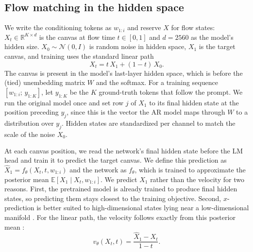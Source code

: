 \documentclass[11pt]{article}
\begin{document}
\subsection{Flow matching in the hidden space}
We write the conditioning tokens as $w_{1:i}$ and reserve $X$ for flow states: $X_t \in \mathbb{R}^{K\times d}$ is the canvas at flow time $t\in[0,1]$ and $d=2560$ as the model's hidden size. $X_0\sim\mathcal{N}(0,I)$ is random noise in hidden space, $X_1$ is the target canvas, and training uses the standard linear path
\begin{equation*}
X_t = t\,X_1 + (1-t)\,X_0 .
\end{equation*}
The canvas is present in the model's last-layer hidden space, which is before the (tied) unembedding matrix $W$ and the softmax. For a training sequence $[w_{1:i};\,y_{1:K}]$, let $y_{1:K}$ be the $K$ ground-truth tokens that follow the prompt. We run the original model once and set row $j$ of $X_1$ to its final hidden state at the position preceding $y_j$, since this is the vector the AR model maps through $W$ to a distribution over $y_j$. Hidden states are standardized per channel to match the scale of the noise $X_0$.

At each canvas position, we read the network's final hidden state before the LM head and train it to predict the target canvas. We define this prediction as $\hat{X}_1 = f_\theta(X_t, t, w_{1:i})$ and the network as $f_\theta$, which is trained to approximate the posterior mean $\mathbb{E}[X_1 \mid X_t, w_{1:i}]$. We predict $X_1$ rather than the velocity for two reasons. First, the pretrained model is already trained to produce final hidden states, so predicting them stays closest to the training objective. Second, $x$-prediction is better suited to high-dimensional states lying near a low-dimensional manifold \citep{li2025backtobasics,feng2026diffusibility}. For the linear path, the velocity follows exactly from this posterior mean \citep{albergo2025stochastic,lee2026flm}:
\begin{equation*}
v_\theta(X_t,t) = \frac{\hat{X}_1 - X_t}{1-t}.
\end{equation*}
\end{document}
